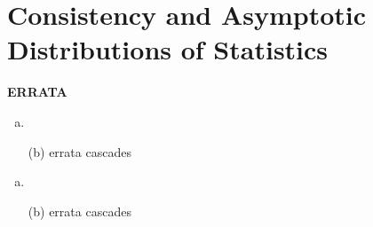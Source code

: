 \chapter{Consistency and Asymptotic Distributions of Statistics}

\begin{exer}
	\textbf{ERRATA}
	\begin{enumerate}[(a)]
		\item 
		\item[(b)] errata cascades
	\end{enumerate}
\end{exer}

\begin{exer}
	
	\begin{enumerate}[(a)]
		\item
		\item[(b)] errata cascades
	\end{enumerate}
\end{exer}